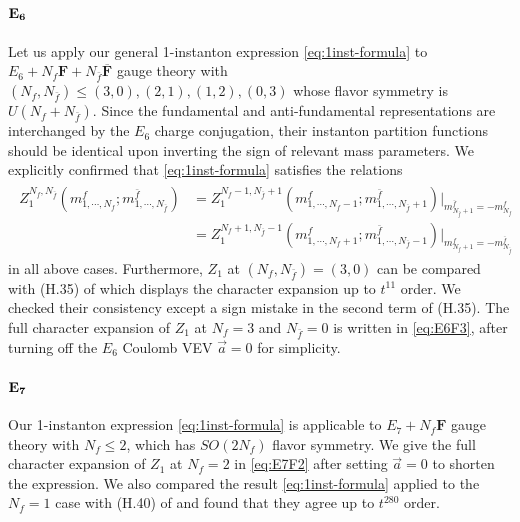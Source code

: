 \documentclass[letterpaper, 11pt]{article}
\begin{document}
{\paragraph{$\bf E_6$}

Let us apply our general 1-instanton expression \eqref{eq:1inst-formula} to $E_6 + N_f \mathbf{F} + N_{\bar{f}}\overline{\mathbf{F}}$ gauge theory with $(N_f,N_{\bar{f}}) \leq (3,0), (2,1), (1,2),(0,3)$ whose flavor symmetry is $U(N_f 
+ N_{\bar{f}})$. Since the fundamental and anti-fundamental representations are interchanged by the $E_6$ charge conjugation, their instanton partition functions should be identical upon inverting the sign of relevant mass parameters. We explicitly confirmed that \eqref{eq:1inst-formula} satisfies the relations
\begin{align}
\begin{split}
  Z_{1}^{N_f,N_{\bar{f}}}(m^f_{1, \cdots, N_f}; m^{\bar{f}}_{1,\cdots,N_{\bar{f}}}) &= Z_{1}^{N_f-1,N_{\bar{f}}+1}(m^f_{1, \cdots, N_f-1}; m^{\bar{f}}_{1,\cdots,N_{\bar{f}}+1})\big|_{m^{\bar{f}}_{N_{\bar{f}}+1} = -m^f_{N_f}}\\ 
  &= Z_{1}^{N_f+1,N_{\bar{f}}-1}(m^f_{1, \cdots, N_f+1}; m^{\bar{f}}_{1,\cdots,N_{\bar{f}}-1})\big|_{m^{f}_{N_{f}+1} = -m^{\bar{f}}_{N_{\bar{f}}}}
\end{split}
\end{align}
in all above cases. Furthermore, $Z_1$ at $(N_f, N_{\bar{f}}) = (3,0)$ can be compared with (H.35) of \cite{DelZotto:2018tcj} which displays the character expansion up to $t^{11}$ order. We checked their consistency except a sign mistake in the second term of (H.35). The full character expansion of $Z_1$ at $N_f=3$ and $N_{\bar{f}}=0$ is written in \eqref{eq:E6F3}, after turning off the $E_6$ Coulomb VEV $\vec{a} = 0$ for simplicity.


\paragraph{$\bf E_7$}

Our 1-instanton expression \eqref{eq:1inst-formula} is applicable to $E_7 + N_f\mathbf{F}$ gauge theory with $N_f \leq 2$, which has $SO(2N_f)$ flavor symmetry. We give the full character expansion of $Z_1$ at $N_f=2$ in \eqref{eq:E7F2} after setting $\vec{a}=0$ to shorten the expression. We also compared the result \eqref{eq:1inst-formula} applied to the $N_f = 1$ case with (H.40) of \cite{DelZotto:2018tcj} and found that they agree up to $t^{280}$ order.


}
\end{document}
